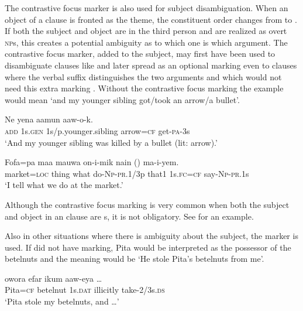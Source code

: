 The contrastive focus marker is also used for subject disambiguation. When an object of a clause is fronted as the theme, the constituent order changes from  to . If both the subject and object are in the third person and are realized as overt \textsc{np}s, this creates a potential ambiguity as to which one is which argument. The contrastive focus marker, added to the subject, may first have been used to disambiguate clauses like  and later spread as an optional marking even to clauses where the verbal suffix distinguishes the two arguments and which would not need this extra marking . Without the contrastive focus marking the example  would mean `and my younger sibling got/took an arrow/a bullet'.

\ea%
\label{ex:9:x1695}
\gll Ne  yena  aamun    aaw-o-k. \\
\textsc{add}  1s.\textsc{gen}  1s/p.younger.sibling  arrow=\textsc{cf}  get-\textsc{pa}-3s      \\
\glt`And my younger sibling was killed by a bullet (lit: arrow).'
\z


\ea%
\label{ex:9:x1696}
\gll Fofa=pa  maa  mauwa  on-i-mik  nain  () ma-i-yem. \\
market=\textsc{loc}  thing  what  do-\textsc{Np}-\textsc{pr}.1/3p  that1  1s.\textsc{fc}=\textsc{cf} say-\textsc{Np}-\textsc{pr}.1s     \\
\glt`I tell what we do at the market.' 
\z


Although the contrastive focus marking is very common when both the subject and object in an  clause are s, it is not obligatory. See  for an example.

Also in other situations where there is ambiguity about the subject, the  marker is used. If  did not have  marking, Pita would be interpreted as the possessor of the betelnuts and the meaning would be `He stole Pita's betelnuts from me'.

\ea%
\label{ex:9:x1705}
\gll {}  owora  efar  ikum  aaw-eya {\dots}\\
Pita=\textsc{cf}  betelnut  1s.\textsc{dat}  illicitly  take-2/3s.\textsc{ds}\\
\glt`Pita stole my betelnuts, and {\dots}'
\z


